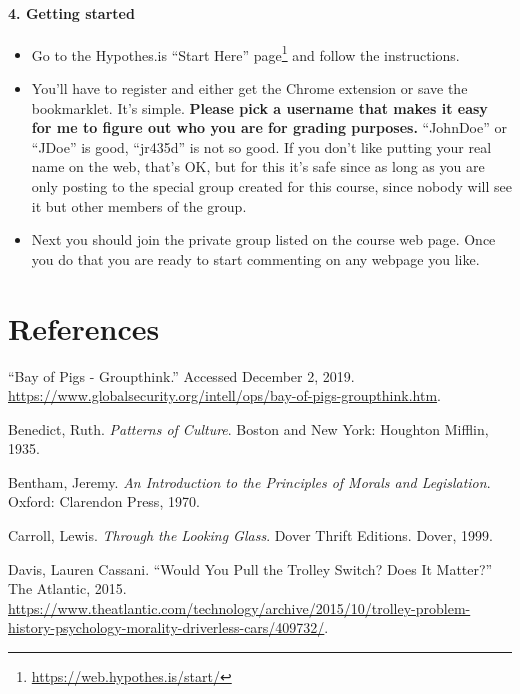 \documentclass[
  12pt, openany]{book}
\renewcommand{\href}[2]{#2\footnote{\url{#1}}}
\theoremstyle{definition}
\theoremstyle{definition}
\theoremstyle{definition}
\theoremstyle{remark}
\begin{document}
\hypertarget{getting-started}{%
\subsubsection*{4. Getting started}\label{getting-started}}


\begin{itemize}
\item
  Go to the Hypothes.is \href{https://web.hypothes.is/start/}{``Start Here'' page} and follow the instructions.
\item
  You'll have to register and either get the Chrome extension or save the bookmarklet. It's simple. \textbf{Please pick a username that makes it easy for me to figure out who you are for grading purposes.} ``JohnDoe'' or ``JDoe'' is good, ``jr435d'' is not so good. If you don't like putting your real name on the web, that's OK, but for this it's safe since as long as you are only posting to the special group created for this course, since nobody will see it but other members of the group.
\item
  Next you should join the private group listed on the course web page. Once you do that you are ready to start commenting on any webpage you like.
\end{itemize}

\hypertarget{references}{%
\chapter*{References}\label{references}}


\hypertarget{refs}{}
\leavevmode\hypertarget{ref-BayPigsGroupthink}{}%
``Bay of Pigs - Groupthink.'' Accessed December 2, 2019. \url{https://www.globalsecurity.org/intell/ops/bay-of-pigs-groupthink.htm}.

\leavevmode\hypertarget{ref-benedictPatternsCulture1935}{}%
Benedict, Ruth. \emph{Patterns of Culture}. Boston and New York: Houghton Mifflin, 1935.

\leavevmode\hypertarget{ref-benthamIntroductionPrinciplesMorals1970}{}%
Bentham, Jeremy. \emph{An Introduction to the Principles of Morals and Legislation}. Oxford: Clarendon Press, 1970.

\leavevmode\hypertarget{ref-carrollLookingGlass1999}{}%
Carroll, Lewis. \emph{Through the Looking Glass}. Dover Thrift Editions. Dover, 1999.

\leavevmode\hypertarget{ref-davisWouldYouPull2015}{}%
Davis, Lauren Cassani. ``Would You Pull the Trolley Switch? Does It Matter?'' The Atlantic, 2015. \url{https://www.theatlantic.com/technology/archive/2015/10/trolley-problem-history-psychology-morality-driverless-cars/409732/}.
\end{document}
